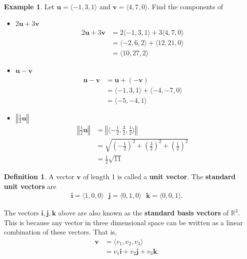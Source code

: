 \documentclass[12pt, letter]{article}
\theoremstyle{plain}
\numberwithin{theorem}{section}
\theoremstyle{definition}
\newtheorem{definition}[theorem]{Definition}
\newtheorem{example}[theorem]{Example}
\newcommand{\R}{\mathbb{R}}
\begin{document}
\bigskip

\hrulefill

\bigskip

\begin{example}
Let $\bm{u} = \langle -1, 3, 1 \rangle$ and $\bm{v} = \langle 4, 7, 0 \rangle$. Find the components of
\begin{itemize}
\item $2\bm{u}+ 3\bm{v}$\\
\begin{align*}
2\bm{u}+3\bm{v} &= 2\langle -1, 3, 1 \rangle+3\langle 4, 7, 0 \rangle\\
&= \langle -2, 6, 2 \rangle + \langle 12, 21, 0 \rangle\\
&= \langle 10, 27, 2 \rangle
\end{align*}
\item $\bm{u}-\bm{v}$
\begin{align*}
\bm{u}-\bm{v} &= \bm{u}+(-\bm{v})\\
&= \langle -1,3,1 \rangle + \langle -4, -7, 0 \rangle\\
&= \langle -5, -4, 1 \rangle
\end{align*}
\item $\left\Vert\frac{1}{2} \bm{u}\right\Vert$
\begin{align*}
\left\Vert\frac{1}{2} \bm{u}\right\Vert &= \left\Vert \langle -\frac{1}{2},\frac{3}{2},\frac{1}{2}\rangle \right\Vert\\
&= \sqrt{\left(-\frac{1}{2}\right)^2+\left(\frac{3}{2}\right)^2+\left(\frac{1}{2}\right)^2}\\
&= \frac{1}{2} \sqrt{11}
\end{align*}
\end{itemize}
\end{example}

\bigskip

\hrulefill

\bigskip

\begin{definition}
A vector $\bm{v}$ of length 1 is called a \textbf{unit vector}. The \textbf{standard unit vectors} are
\begin{align*}
\bm{i} = \langle 1, 0, 0 \rangle \ \ \ \bm{j} = \langle 0, 1, 0 \rangle \ \ \ \bm{k} = \langle 0, 0, 1 \rangle.
\end{align*}
\end{definition}

\bigskip

The vectors $\bm{i}, \bm{j}, \bm{k}$ above are also known as the \textbf{standard basis vectors} of $\R^3$. This is because any vector in three dimensional space can be written as a linear combination of these vectors. That is,
\begin{align*}
\bm{v} &= \langle v_1, v_2, v_3 \rangle\\
&= v_1 \bm{i} + v_2 \bm{j} + v_3 \bm{k}.
\end{align*}
\end{document}
